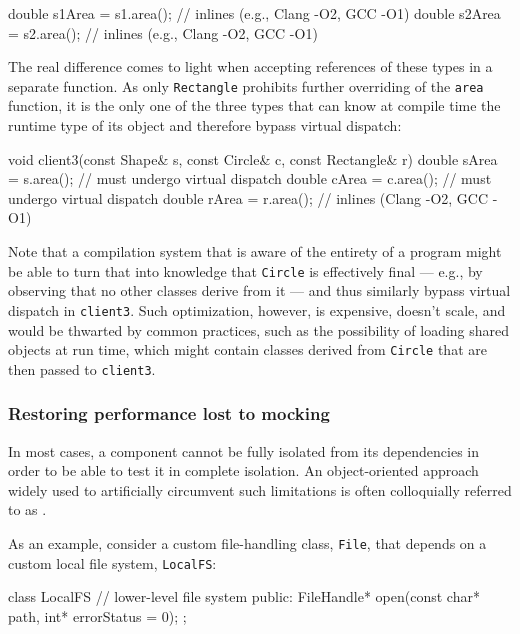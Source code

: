 {{\begin{emcppslisting}
{    double s1Area = s1.area();  // inlines (e.g., Clang -O2, GCC -O1)
    double s2Area = s2.area();  // inlines (e.g., Clang -O2, GCC -O1)
}
\end{emcppslisting}
    

\noindent The real difference comes to light when accepting references of these
types in a separate function. As only \lstinline!Rectangle! prohibits
further overriding of the \lstinline!area! function, it is the only one of
the three types that can know at compile time the runtime type of its
object and therefore bypass virtual dispatch:

\begin{emcppslisting}
void client3(const Shape& s, const Circle& c, const Rectangle& r)
{
    double sArea = s.area();  // must undergo virtual dispatch
    double cArea = c.area();  // must undergo virtual dispatch
    double rArea = r.area();  // inlines (Clang -O2, GCC -O1)
}
\end{emcppslisting}
    

\noindent Note that a compilation system that is aware of the entirety of a
program might be able to turn that into knowledge that \lstinline!Circle!
is effectively final --- e.g., by observing that no other classes derive
from it --- and thus similarly bypass virtual dispatch in
\lstinline!client3!. Such optimization, however, is expensive, doesn't
scale, and would be thwarted by common practices, such as the
possibility of loading shared objects at run time, which might contain
classes derived from \lstinline!Circle! that are then passed to
\lstinline!client3!.

\subsubsection[Restoring performance lost to mocking]{Restoring performance lost to mocking}\label{restoring-performance-lost-to-mocking}

In most cases, a component cannot be fully isolated from its
dependencies in order to be able to test it in complete isolation. An
object-oriented approach widely used to artificially circumvent such
limitations is often colloquially referred to as .

As an example, consider a custom file-handling class, \lstinline!File!,
that depends on a custom local file system, \lstinline!LocalFS!:

\begin{emcppslisting}
class LocalFS  // lower-level file system
{
public:
    FileHandle* open(const char* path, int* errorStatus = 0);
};


\end{emcppslisting}}}
